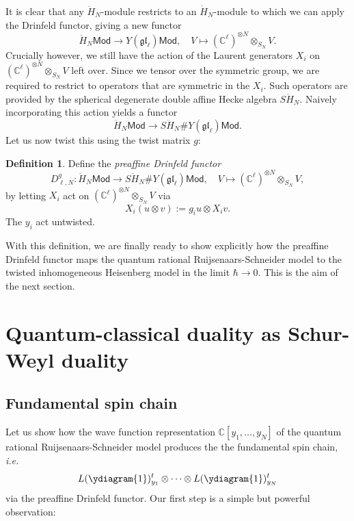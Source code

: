 \documentclass[11pt]{report}
\theoremstyle{definition}
\newtheorem{definition}[theorem]{Definition}
\theoremstyle{remark}
\theoremstyle{remark}
\newcommand{\C}{\mathbb{C}}
\begin{document}
It is clear that any $\ddot H_N$-module restricts to an $\dot H_N$-module to which we can apply the Drinfeld functor, giving a new functor
\begin{equation*}
\ddot H_N\mathsf{Mod} \to Y(\mathfrak{gl}_\ell)\mathsf{Mod}, \quad V \mapsto (\C^\ell)^{\otimes N} \otimes_{S_N} V.
\end{equation*}
Crucially however, we still have the action of the Laurent generators $X_i$ on $(\C^\ell)^{\otimes N} \otimes_{S_N} V$ left over. Since we tensor over the symmetric group, we are required to restrict to operators that are symmetric in the $X_i$. Such operators are provided by the spherical degenerate double affine Hecke algebra $S\ddot H_N$. Naively incorporating this action yields a functor
\begin{equation*}
\ddot H_N\mathsf{Mod} \to S\ddot H_N \# Y(\mathfrak{gl}_\ell)\mathsf{Mod}.
\end{equation*}
Let us now twist this using the twist matrix $g$:

\begin{definition}
Define the \emph{preaffine Drinfeld functor}
\begin{equation*}
D_{\ell,N}^g: \ddot H_N\mathsf{Mod} \to S\ddot H_N \# Y(\mathfrak{gl}_\ell)\mathsf{Mod}, \quad V \mapsto (\C^\ell)^{\otimes N} \otimes_{S_N} V,
\end{equation*}
by letting $X_i$ act on $(\C^\ell)^{\otimes N} \otimes_{S_N} V$ via
\begin{equation*}
X_i(u \otimes v) := g_i u \otimes X_i v.
\end{equation*}
The $y_i$ act untwisted.
\end{definition}

With this definition, we are finally ready to show explicitly how the preaffine Drinfeld functor maps the quantum rational Ruijsenaars-Schneider model to the twisted inhomogeneous Heisenberg model in the limit $\hbar \to 0$. This is the aim of the next section.

\section{Quantum-classical duality as Schur-Weyl duality}

\subsection{Fundamental spin chain}

Let us show how the wave function representation $\C[y_1,...,y_N]$ of the quantum rational Ruijsenaars-Schneider model produces the the fundamental spin chain, \emph{i.e.}
\begin{equation*}
L(\ydiagram{1})_{y_1}^t \otimes \cdots \otimes L(\ydiagram{1})_{y_N}^t
\end{equation*}
via the preaffine Drinfeld functor. Our first step is a simple but powerful observation:
\end{document}
